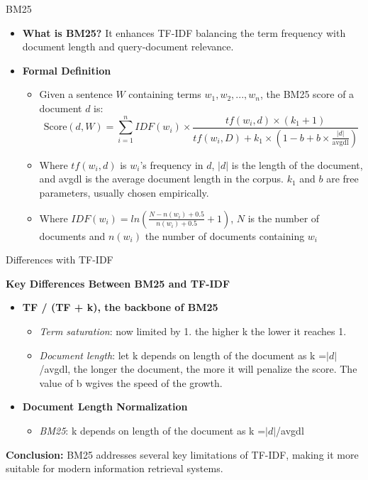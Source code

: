 \documentclass{beamer}
\newenvironment{stepitemize}{\begin{itemize}[<+->]}{\end{itemize} }
\begin{document}
\begin{frame}{BM25}
\begin{stepitemize}
\item \textbf{What is BM25?}\newline
It enhances TF-IDF balancing the term frequency with document length and query-document relevance.

\item \textbf{Formal Definition}
\begin{itemize}
  \item Given a sentence \( W \) containing terms \( w_1, w_2, ..., w_n \), the BM25 score of a document \( d \) is:
  \[ \text{Score}(d, W) = \sum_{i=1}^{n} IDF(w_i) \times \frac{tf(w_i, d) \times (k_1 + 1)}{tf(w_i, D) + k_1 \times (1 - b + b \times \frac{|d|}{\text{avgdl}})} \]
  \item Where \( tf(w_i, d) \) is \( w_i \)'s frequency in \( d \), \( |d| \) is the length of the document, and avgdl is the average document length in the corpus. \( k_1 \) and \( b \) are free parameters, usually chosen empirically.
  \item Where \( IDF(w_i) = ln(\frac{N - n(w_i) + 0.5}{n(w_i) + 0.5} + 1)\), \( N \) is the number of documents and \(n(w_i)\) the number of documents containing \(w_i\)
\end{itemize}
\end{stepitemize}
\end{frame}

\begin{frame}{Differences with TF-IDF}

\textbf{Key Differences Between BM25 and TF-IDF}

\begin{itemize}
  \item \textbf{TF / (TF + k), the backbone of BM25}
    \begin{itemize}
      \item \textit{Term saturation}: now limited by 1. the higher k the lower it reaches 1.
      \item \textit{Document length}: let k depends on length of the document as k =\( |d| \)/avgdl, the longer the document, the more it will penalize the score. The value of b wgives the speed of the growth.
    \end{itemize}

  \item \textbf{Document Length Normalization}
    \begin{itemize}
      \item \textit{BM25}: k depends on length of the document as k =\( |d| \)/avgdl
    \end{itemize}

\end{itemize}

\textbf{Conclusion:} BM25 addresses several key limitations of TF-IDF, making it more suitable for modern information retrieval systems.

\end{frame}
\end{document}
